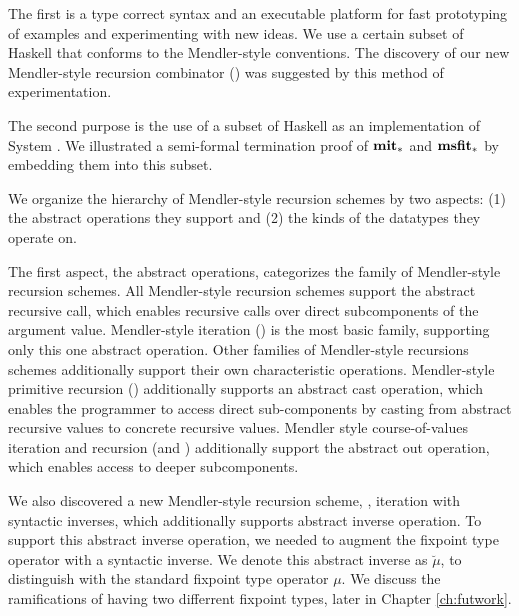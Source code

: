 The first is a type correct syntax and an executable platform for
fast prototyping of examples and experimenting with new ideas. We use a certain
subset of Haskell that conforms to the Mendler-style conventions.
The discovery of our new Mendler-style recursion combinator (\MsfIt)
was suggested by this method of experimentation.

The second purpose is the use of a subset of Haskell as
an implementation of System \Fw. We illustrated a semi-formal termination proof of
$\mathbf{mit}_{*}$ and $\mathbf{msfit}_{*}$ by embedding them into this subset.

We organize the hierarchy of Mendler-style recursion schemes
by two aspects: (1) the abstract operations they support and
(2) the kinds of the datatypes they operate on.

The first aspect, the abstract operations, categorizes the family
of Mendler-style recursion schemes. All Mendler-style recursion schemes
support the abstract recursive call, which enables recursive
calls over direct subcomponents of the argument value.
Mendler-style iteration (\MIt) is the most basic family,
supporting only this one abstract operation. Other
families of Mendler-style recursions schemes additionally support
their own characteristic operations. Mendler-style primitive recursion (\MPr)
additionally supports an abstract cast operation, which enables the programmer
to access direct sub-components by casting from abstract recursive values to
concrete recursive values. Mendler style course-of-values iteration and
recursion (\McvIt and \McvPr) additionally support the abstract out
operation, which enables access to deeper subcomponents. 

We also discovered
a new Mendler-style recursion scheme, \MsfIt, iteration with syntactic inverses,
which additionally supports abstract inverse operation. To support
this abstract inverse operation, we needed to augment the fixpoint type operator
with a syntactic inverse. We denote this abstract inverse as $\breve{\mu}$,
to distinguish with the standard fixpoint type operator $\mu$. We discuss
the ramifications of having two differrent fixpoint types, later in
Chapter \ref{ch:futwork}.

